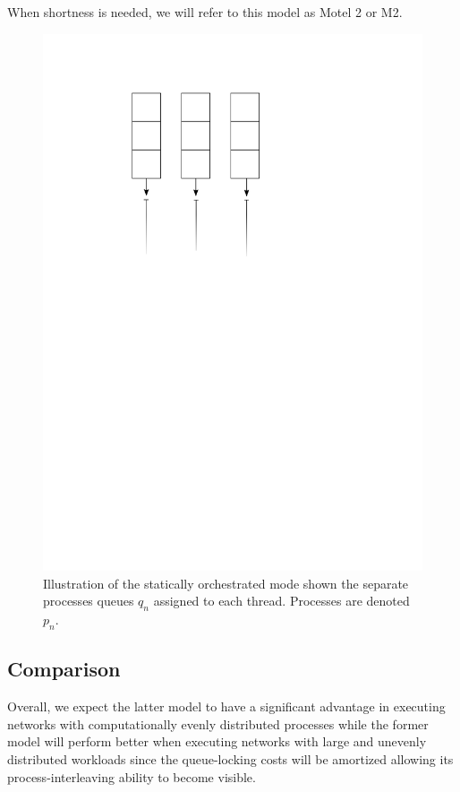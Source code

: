When shortness is needed, we will refer to this model as Motel 2 or M2.

\begin{figure}
\centering
\includegraphics{figures/orch-model}
\caption[Statically orchestrated model]{Illustration of the statically
  orchestrated mode shown the separate processes queues $q_n$ assigned
to each thread. Processes are denoted $p_n$. }
\label{fig:orchmodel}
\end{figure}

\subsection{Comparison}
Overall, we expect the latter model to have a significant advantage in
executing networks with computationally evenly distributed processes
while the former model will perform better when
executing networks with large and unevenly distributed workloads since
the queue-locking costs will be amortized allowing its
process-interleaving ability to become visible.

